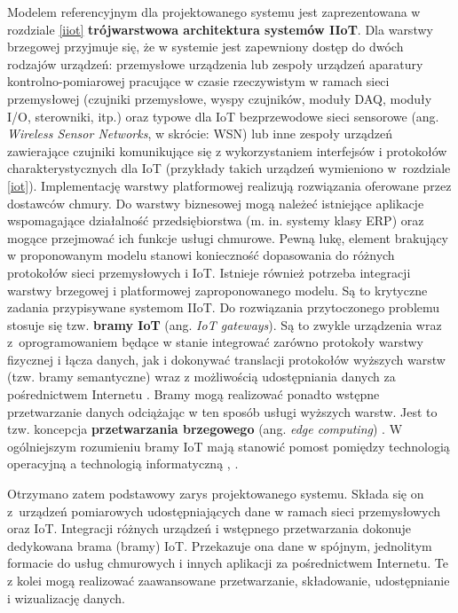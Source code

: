 \documentclass[a4paper, 12pt, twoside]{article}
\begin{document}
Modelem referencyjnym dla projektowanego systemu jest zaprezentowana w rozdziale
\ref{iiot} \textbf{trójwarstwowa architektura systemów IIoT}. Dla warstwy brzegowej przyjmuje
się, że w systemie jest zapewniony dostęp do dwóch rodzajów urządzeń: przemysłowe urządzenia
lub zespoły urządzeń aparatury kontrolno-pomiarowej pracujące w czasie rzeczywistym
w ramach sieci przemysłowej
(czujniki przemysłowe, wyspy czujników, moduły DAQ, moduły I/O, sterowniki, itp.)
oraz typowe dla IoT bezprzewodowe sieci sensorowe (ang. \emph{Wireless Sensor Networks}, w skrócie: WSN)
lub inne zespoły urządzeń zawierające czujniki komunikujące się z wykorzystaniem
interfejsów i protokołów charakterystycznych dla IoT \cite{iiot-gateway-introduction}
(przykłady takich urządzeń wymieniono w~rozdziale \ref{iot}). Implementację warstwy
platformowej realizują rozwiązania oferowane przez dostawców chmury.
Do warstwy biznesowej mogą należeć istniejące aplikacje
wspomagające działalność przedsiębiorstwa
(m. in. systemy klasy ERP) oraz mogące przejmować ich funkcje usługi chmurowe.
Pewną lukę, element brakujący w proponowanym modelu stanowi konieczność dopasowania
do różnych protokołów sieci przemysłowych i IoT. Istnieje również potrzeba integracji
warstwy brzegowej i platformowej zaproponowanego modelu. Są to krytyczne zadania
przypisywane systemom IIoT. Do rozwiązania
przytoczonego problemu stosuje się tzw. \textbf{bramy IoT} (ang. \emph{IoT gateways}). Są to zwykle
urządzenia wraz z~oprogramowaniem będące w stanie integrować zarówno protokoły
warstwy fizycznej i łącza danych, jak i dokonywać translacji protokołów wyższych warstw
(tzw. bramy semantyczne) wraz z możliwością udostępniania danych za pośrednictwem
Internetu \cite{iiot-heterogenous-gateways}. Bramy mogą realizować ponadto
wstępne przetwarzanie danych odciążając w ten sposób usługi wyższych warstw.
Jest to tzw. koncepcja \textbf{przetwarzania brzegowego} (ang. \emph{edge computing}) \cite{iot-gateway-medical-and-industrial}.
W ogólniejszym rozumieniu bramy IoT mają stanowić pomost pomiędzy technologią operacyjną a
technologią informatyczną \cite{iiot-gateway-introduction}, \cite{iiot-challenges-opportunities-directions}.

Otrzymano zatem podstawowy zarys projektowanego systemu.
Składa się on z~urządzeń pomiarowych udostępniających dane w ramach sieci
przemysłowych oraz IoT. Integracji różnych urządzeń i wstępnego przetwarzania
dokonuje dedykowana brama (bramy) IoT. Przekazuje ona dane w spójnym, jednolitym
formacie do usług chmurowych i innych aplikacji za pośrednictwem Internetu.
Te z kolei mogą realizować zaawansowane przetwarzanie, składowanie, udostępnianie
i wizualizację danych.
\end{document}
